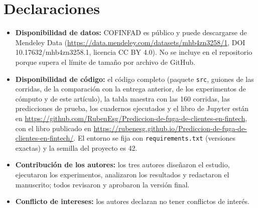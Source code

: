 \documentclass[pdflatex,sn-mathphys-num]{sn-jnl}
\begin{document}
\section*{Declaraciones}

\begin{itemize}
\item \textbf{Disponibilidad de datos:} COFINFAD es público y puede descargarse de Mendeley Data (\url{https://data.mendeley.com/datasets/mhb4zn3258/1}, DOI 10.17632/mhb4zn3258.1, licencia CC BY 4.0). No se incluye en el repositorio porque supera el límite de tamaño por archivo de GitHub.
\item \textbf{Disponibilidad de código:} el código completo (paquete \texttt{src}, guiones de las corridas, de la comparación con la entrega anterior, de los experimentos de cómputo y de este artículo), la tabla maestra con las 160 corridas, las predicciones de prueba, los cuadernos ejecutados y el libro de Jupyter están en \url{https://github.com/RubenEsg/Prediccion-de-fuga-de-clientes-en-fintech}, con el libro publicado en \url{https://rubenesg.github.io/Prediccion-de-fuga-de-clientes-en-fintech/}. El entorno se fija con \texttt{requirements.txt} (versiones exactas) y la semilla del proyecto es 42.
\item \textbf{Contribución de los autores:} los tres autores diseñaron el estudio, ejecutaron los experimentos, analizaron los resultados y redactaron el manuscrito; todos revisaron y aprobaron la versión final.
\item \textbf{Conflicto de intereses:} los autores declaran no tener conflictos de interés.
\end{itemize}


\end{document}
